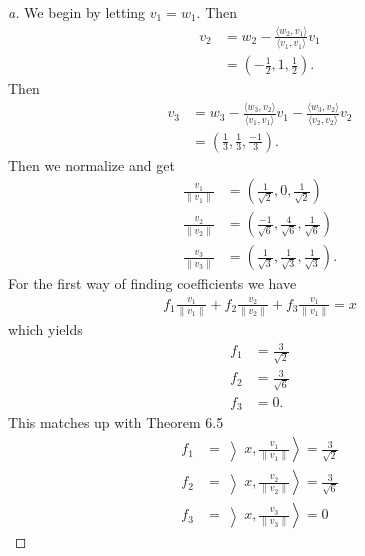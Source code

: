 \documentclass[leqno]{article}
\theoremstyle{nonumberplain}
\newtheorem{proof}{Proof}
\begin{document}
\begin{proof}[a]
We begin by letting $v_1=w_1$.  Then
\begin{align*}
v_2 &= w_2 -\frac{\langle w_2,v_1 \rangle}{\langle v_1, v_1 \rangle} v_1\\
&= \left(-\frac{1}{2},1,\frac{1}{2}\right).
\end{align*}
Then
\begin{align*}
v_3 &= w_3 -\frac{\langle w_3 , v_2 \rangle}{\langle v_1, v_1 \rangle} v_1 -\frac{\langle w_3, v_2 \rangle}{\langle v_2,v_2 \rangle} v_2\\
&= \left( \frac{1}{3},\frac{1}{3},\frac{-1}{3} \right).
\end{align*}
Then we normalize and get
\begin{align*}
\frac{v_1}{\|v_1\|}&= \left( \frac{1}{\sqrt{2}},0,\frac{1}{\sqrt{2}} \right)\\
\frac{v_2}{\|v_2\|}&= \left( \frac{-1}{\sqrt{6}},\frac{4}{\sqrt{6}},\frac{1}{\sqrt{6}} \right)\\
\frac{v_3}{\|v_3\|}&= \left( \frac{1}{\sqrt{3}},\frac{1}{\sqrt{3}},\frac{1}{\sqrt{3}} \right).
\end{align*}
For the first way of finding coefficients we have
\begin{align*}
f_1 \frac{v_1}{\|v_1\|} + f_2 \frac{v_2}{\|v_2\|} + f_3 \frac{v_1}{\|v_1\|} = x
\end{align*}
which yields 
\begin{align*}
f_1 &= \frac{3}{\sqrt{2}}\\
f_2 &= \frac{3}{\sqrt{6}}\\
f_3 &= 0.
\end{align*}
This matches up with Theorem 6.5
\begin{align*}
f_1 &= \left\rangle x, \frac{v_1}{\|v_1\|} \right\rangle = \frac{3}{\sqrt{2}}\\
f_2 &= \left\rangle x, \frac{v_2}{\|v_2\|} \right\rangle = \frac{3}{\sqrt{6}}\\
f_3 &= \left\rangle x, \frac{v_3}{\|v_3\|} \right\rangle = 0
\end{align*}
\end{proof}
\end{document}
